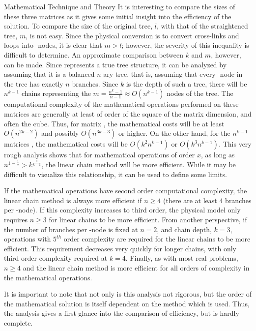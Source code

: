 \begin{chapter}{Mathematical Technique and Theory\label{chap:math}}
  It is interesting to compare the sizes of these three matrices as it
  gives some initial insight into the efficiency of the solution.  To
  compare the size of the original tree, $l$, with that of the
  straightened tree, $m$, is not easy.  Since the physical conversion
  is to convert cross-links and loops into \pc-nodes, it is clear that
  $m > l$; however, the severity of this inequality is difficult to
  determine.  An approximate comparison between $k$ and $m$, however,
  can be made.  Since  represents a true tree structure, it can
  be analyzed by assuming that it is a balanced $n$-ary tree, that is,
  assuming that every \pc-node in the tree has exactly $n$ branches.
  Since $k$ is the depth of such a tree, there will be $n^{k-1}$
  chains representing the $m = \frac{n^k -1}{n-1} \approx O(n^{k-1})$
  nodes of the tree.  The computational complexity of the mathematical
  operations performed on these matrices are generally at least of
  order of the square of the matrix dimension, and often the cube.
  Thus, for matrix , the mathematical costs will be at least
  $O(n^{2k-2})$ and possibly $O(n^{3k-3})$ or higher.  On the other
  hand, for the $n^{k-1}$ matrices , the mathematical costs
  will be $O(k^2n^{k-1})$ or $O(k^3n^{k-1})$.  This very rough
  analysis shows that for mathematical operations of order $x$, as
  long as $n^{1-\frac{1}{x}} > k^{\frac{1}{k-1}}$, the linear chain
  method will be more efficient.  While it may be difficult to
  visualize this relationship, it can be used to define some limits.
  
  If the mathematical operations have second order computational
  complexity, the linear chain method is always more efficient if $n
  \geq 4$ (there are at least 4 branches per \pc-node).  If this
  complexity increases to third order, the physical model only
  requires $n \geq 3$ for linear chains to be more efficient.  From
  another perspective, if the number of branches per \pc-node is fixed
  at $n = 2$, and chain depth, $k = 3$, operations with $5^{th}$ order
  complexity are required for the linear chains to be more efficient.
  This requirement decreases very quickly for longer chains, with only
  third order complexity required at $k = 4$.  Finally, as with most
  real problems, $n \geq 4$ and the linear chain method is more
  efficient for all orders of complexity in the mathematical
  operations.
  
  It is important to note that not only is this analysis not rigorous,
  but the order of the mathematical solution is itself dependent on
  the method which is used.  Thus, the analysis gives a first glance
  into the comparison of efficiency, but is hardly complete.
  

\end{chapter}
